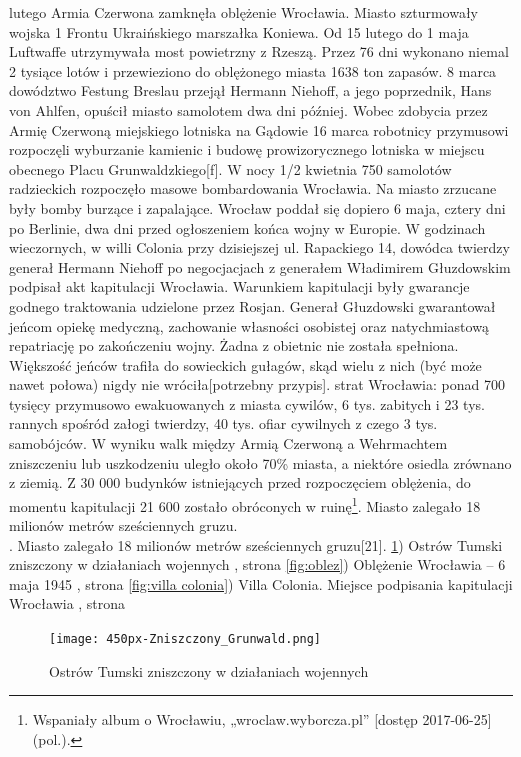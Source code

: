 \documentclass{article}
\begin{document}
\vspace{3mm} %
 lutego Armia Czerwona zamknęła oblężenie Wrocławia. Miasto szturmowały wojska 1 Frontu Ukraińskiego marszałka Koniewa. Od 15 lutego do 1 maja Luftwaffe utrzymywała most powietrzny z Rzeszą. Przez 76 dni wykonano niemal 2 tysiące lotów i przewieziono do oblężonego miasta 1638 ton zapasów. 8 marca dowództwo Festung Breslau przejął Hermann Niehoff, a jego poprzednik, Hans von Ahlfen, opuścił miasto samolotem dwa dni później. Wobec zdobycia przez Armię Czerwoną miejskiego lotniska na Gądowie 16 marca robotnicy przymusowi rozpoczęli wyburzanie kamienic i budowę prowizorycznego lotniska w miejscu obecnego Placu Grunwaldzkiego[f]. W nocy 1/2 kwietnia 750 samolotów radzieckich rozpoczęło masowe bombardowania Wrocławia. Na miasto zrzucane były bomby burzące i zapalające.
\vspace{3mm} %
\newline Wrocław poddał się dopiero 6 maja, cztery dni po Berlinie, dwa dni przed ogłoszeniem końca wojny w Europie. W godzinach wieczornych, w willi Colonia przy dzisiejszej ul. Rapackiego 14, dowódca twierdzy generał Hermann Niehoff po negocjacjach z generałem Władimirem Głuzdowskim podpisał akt kapitulacji Wrocławia. Warunkiem kapitulacji były gwarancje godnego traktowania udzielone przez Rosjan. Generał Głuzdowski gwarantował jeńcom opiekę medyczną, zachowanie własności osobistej oraz natychmiastową repatriację po zakończeniu wojny. Żadna z obietnic nie została spełniona. Większość jeńców trafiła do sowieckich gułagów, skąd wielu z nich (być może nawet połowa) nigdy nie wróciła[potrzebny przypis].
\vspace{3mm} %
\newlineBilans strat Wrocławia: ponad 700 tysięcy przymusowo ewakuowanych z miasta cywilów, 6 tys. zabitych i 23 tys. rannych spośród załogi twierdzy, 40 tys. ofiar cywilnych z czego 3 tys. samobójców. W wyniku walk między Armią Czerwoną a Wehrmachtem zniszczeniu lub uszkodzeniu uległo około 70\% miasta, a niektóre osiedla zrównano z ziemią. Z 30 000 budynków istniejących przed rozpoczęciem oblężenia, do momentu kapitulacji 21 600 zostało obróconych w ruinę\footnote{ Wspaniały album o Wrocławiu, „wroclaw.wyborcza.pl” [dostęp 2017-06-25] (pol.).}. Miasto zalegało 18 milionów metrów sześciennych gruzu.\\. Miasto zalegało 18 milionów metrów sześciennych gruzu[21].
\newline\ref{fig:ostrtumski}) Ostrów Tumski zniszczony w działaniach wojennych , strona \pageref{fig:ostrtumski}
\newline\ref{fig:oblez}) Oblężenie Wrocławia – 6 maja 1945 , strona \pageref{fig:oblez} 
\newline\ref{fig:villa colonia}) Villa Colonia. Miejsce podpisania kapitulacji Wrocławia , strona \pageref{fig:villa colonia}
\begin{figure}[h!]
\centering
\texttt{[image: 450px-Zniszczony\_Grunwald.png]}
\caption{Ostrów Tumski zniszczony w działaniach wojennych}
\label{fig:ostrtumski}
\end{figure}
\end{document}
